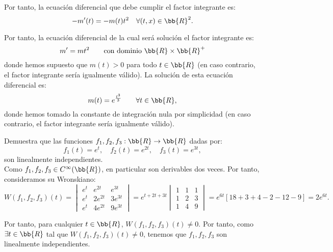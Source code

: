 \documentclass[12pt]{article}
\begin{document}
\begin{ejercicio}
    Por tanto, la ecuación diferencial que debe cumplir el factor integrante es:
    \begin{equation*}
        -m'(t) = -m(t)t^2 \quad \forall (t,x)\in \bb{R}^2.
    \end{equation*}

    Por tanto, la ecuación diferencial de la cual será solución el factor integrante es:
    \begin{equation*}
        m'=mt^2\qquad \text{con dominio }\bb{R}\times \bb{R}^+
    \end{equation*}
    donde hemos supuesto que $m(t)>0$ para todo $t\in \bb{R}$ (en caso contrario, el factor integrante sería igualmente válido). La solución de esta ecuación diferencial es:
    \begin{equation*}
        m(t) = e^{\frac{t^3}{3}}\qquad \forall t\in \bb{R},
    \end{equation*}
    donde hemos tomado la constante de integración nula por simplicidad (en caso contrario, el factor integrante sería igualmente válido).
\end{ejercicio}

\begin{ejercicio}
    Demuestra que las funciones $f_1,f_2,f_3:\bb{R}\to \bb{R}$ dadas por:
    \begin{equation*}
        f_1(t) = e^t, \quad f_2(t) = e^{2t}, \quad f_3(t) = e^{3t},
    \end{equation*}
    son linealmente independientes.\\

    Como $f_1,f_2,f_3\in C^{\infty}(\bb{R})$, en particular son derivables dos veces. Por tanto, consideramos su Wronskiano:
    \begin{equation*}
        W(f_1,f_2,f_3)(t) = \begin{vmatrix}
            e^t & e^{2t} & e^{3t}\\
            e^t & 2e^{2t} & 3e^{3t}\\
            e^t & 4e^{2t} & 9e^{3t}
        \end{vmatrix} = 
        e^{t+2t+3t}\begin{vmatrix}
            1 & 1 & 1\\
            1 & 2 & 3\\
            1 & 4 & 9
        \end{vmatrix} = e^{6t}\left[18+3+4-2-12-9\right] = 2e^{6t}.
    \end{equation*}

    Por tanto, para cualquier $t\in \bb{R}$, $W(f_1,f_2,f_3)(t)\neq 0$. Por tanto, como $\exists t\in \bb{R}$ tal que $W(f_1,f_2,f_3)(t)\neq 0$, tenemos que $f_1,f_2,f_3$ son linealmente independientes.
\end{ejercicio}
\end{document}
